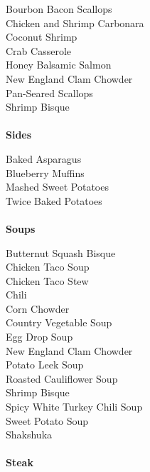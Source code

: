 \documentclass[11pt, twoside, openany]{book}
\begin{document}
Bourbon Bacon Scallops\hrulefill\pageref{bourbon-bacon-scallops}\\
Chicken and Shrimp Carbonara\hrulefill\pageref{chicken-and-shrimp-carbonara}\\
Coconut Shrimp\hrulefill\pageref{coconut-shrimp}\\
Crab Casserole\hrulefill\pageref{crab-casserole}\\
Honey Balsamic Salmon\hrulefill\pageref{honey-balsamic-salmon}\\
New England Clam Chowder\hrulefill\pageref{new-england-clam-chowder}\\
Pan-Seared Scallops\hrulefill\pageref{pan-seared-scallops}\\
Shrimp Bisque\hrulefill\pageref{shrimp-bisque}\\
{~\vspace{2mm}\\ \Large \textbf{Sides}}\hfill\textbf{\pageref{sides}}

Baked Asparagus\hrulefill\pageref{baked-asparagus}\\
Blueberry Muffins\hrulefill\pageref{blueberry-muffins}\\
Mashed Sweet Potatoes\hrulefill\pageref{mashed-sweet-potatoes}\\
Twice Baked Potatoes\hrulefill\pageref{twice-baked-potatoes}\\
{~\vspace{2mm}\\ \Large \textbf{Soups}}\hfill\textbf{\pageref{soups}}

Butternut Squash Bisque\hrulefill\pageref{butternut-squash-bisque}\\
Chicken Taco Soup\hrulefill\pageref{chicken-taco-soup}\\
Chicken Taco Stew\hrulefill\pageref{chicken-taco-stew}\\
Chili\hrulefill\pageref{chili}\\
Corn Chowder\hrulefill\pageref{corn-chowder}\\
Country Vegetable Soup\hrulefill\pageref{country-vegetable-soup}\\
Egg Drop Soup\hrulefill\pageref{egg-drop-soup}\\
New England Clam Chowder\hrulefill\pageref{new-england-clam-chowder}\\
Potato Leek Soup\hrulefill\pageref{potato-leek-soup}\\
Roasted Cauliflower Soup\hrulefill\pageref{roasted-cauliflower-soup}\\
Shrimp Bisque\hrulefill\pageref{shrimp-bisque}\\
Spicy White Turkey Chili Soup\hrulefill\pageref{spicy-white-turkey-chili-soup}\\
Sweet Potato Soup\hrulefill\pageref{sweet-potato-soup}\\
Shakshuka\hrulefill\pageref{shakshuka}\\
{~\vspace{2mm}\\ \Large \textbf{Steak}}\hfill\textbf{\pageref{steak}}
\end{document}
